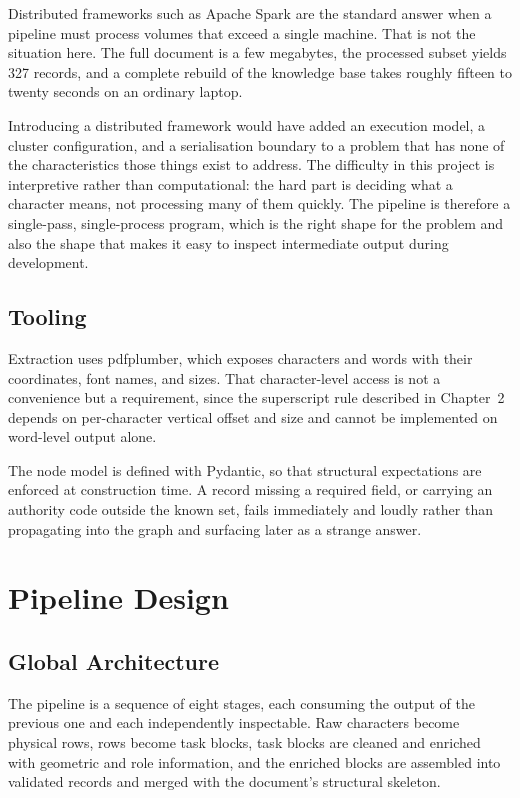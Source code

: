 Distributed frameworks such as Apache Spark are the standard answer when a pipeline must process volumes that exceed a single machine. That is not the situation here. The full document is a few megabytes, the processed subset yields 327 records, and a complete rebuild of the knowledge base takes roughly fifteen to twenty seconds on an ordinary laptop.

Introducing a distributed framework would have added an execution model, a cluster configuration, and a serialisation boundary to a problem that has none of the characteristics those things exist to address. The difficulty in this project is interpretive rather than computational: the hard part is deciding what a character means, not processing many of them quickly. The pipeline is therefore a single-pass, single-process program, which is the right shape for the problem and also the shape that makes it easy to inspect intermediate output during development.

\subsection{Tooling}

Extraction uses pdfplumber, which exposes characters and words with their coordinates, font names, and sizes. That character-level access is not a convenience but a requirement, since the superscript rule described in Chapter~2 depends on per-character vertical offset and size and cannot be implemented on word-level output alone.

The node model is defined with Pydantic, so that structural expectations are enforced at construction time. A record missing a required field, or carrying an authority code outside the known set, fails immediately and loudly rather than propagating into the graph and surfacing later as a strange answer.

\section{Pipeline Design}

\subsection{Global Architecture}

The pipeline is a sequence of eight stages, each consuming the output of the previous one and each independently inspectable. Raw characters become physical rows, rows become task blocks, task blocks are cleaned and enriched with geometric and role information, and the enriched blocks are assembled into validated records and merged with the document's structural skeleton.

